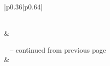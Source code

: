\begin{longtable}{|p{}|p{}|}
	\toprule\noalign{}
	\caption{An Example Project}
	\label{tab:appendix-example-data}                                                                                                                               \\

	\hline
	            &                                                                          \\
	\hline
	\endfirsthead

	{{\tablename\ \thetable{} -- continued from previous page}}                                                                                                     \\
	\hline
	            &                                                                          \\
	\hline
	\endhead

	\hline
	                                                                                                                  \\
	\hline
	\endfoot

	\hline \hline
	\endlastfoot


\end{longtable}
